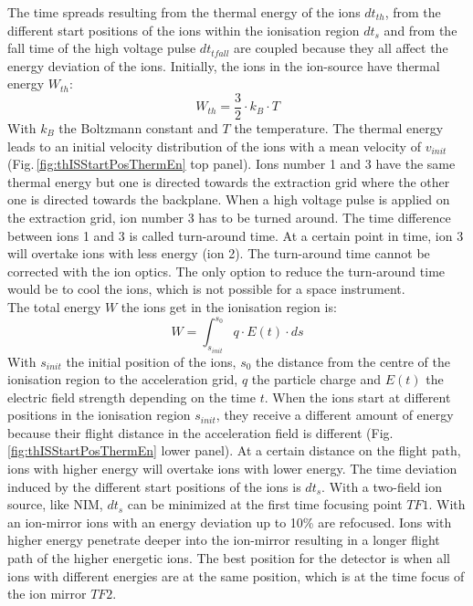 	The time spreads resulting from the thermal energy of the ions $dt_{th}$, from the different start positions of the ions within the ionisation region $dt_s$ and from the fall time of the high voltage pulse $dt_{tfall}$ are coupled because they all affect the energy deviation of the ions. Initially, the ions in the ion-source have thermal energy $W_{th}$:
	\begin{equation}
		W_{th} = \frac{3}{2}\cdot k_B \cdot T
	\end{equation}
	With $k_B$ the Boltzmann constant and $T$ the temperature. The thermal energy leads to an initial velocity distribution of the ions with a mean velocity of $v_{init}$ (Fig.\,\ref{fig:thISStartPosThermEn} top panel). Ions number 1 and 3 have the same thermal energy but one is directed towards the extraction grid where the other one is directed towards the backplane. When a high voltage pulse is applied on the extraction grid, ion number 3 has to be turned around. The time difference between ions 1 and 3 is called turn-around time. At a certain point in time, ion 3 will overtake ions with less energy (ion 2). The turn-around time cannot be corrected with the ion optics. The only option to reduce the turn-around time would be to cool the ions, which is not possible for a space instrument.\\
	The total energy $W$ the ions get in the ionisation region is:
	\begin{equation}
		W = \int_{s_{init}}^{s_0} q\cdot E(t)\cdot ds
		\label{eq:WionsISposEt}
	\end{equation}
	With $s_{init}$ the initial position of the ions, $s_0$ the distance from the centre of the ionisation region to the acceleration grid, $q$ the particle charge and $E(t)$ the electric field strength depending on the time $t$. When the ions start at different positions in the ionisation region $s_{init}$, they receive a different amount of energy because their flight distance in the acceleration field is different (Fig.\,\ref{fig:thISStartPosThermEn} lower panel). At a certain distance on the flight path, ions with higher energy will overtake ions with lower energy. The time deviation induced by the different start positions of the ions is $dt_{s}$. With a two-field ion source, like NIM, $dt_s$ can be minimized at the first time focusing point $TF1$. With an ion-mirror ions with an energy deviation up to 10\% are refocused. Ions with higher energy penetrate deeper into the ion-mirror resulting in a longer flight path of the higher energetic ions. The best position for the detector is when all ions with different energies are at the same position, which is at the time focus of the ion mirror $TF2$.\\
